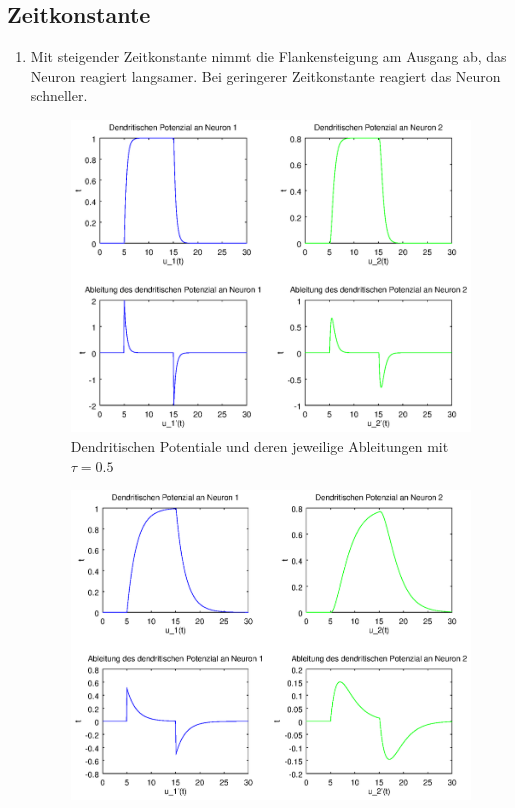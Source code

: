 \documentclass[DIN, pagenumber=false, fontsize=11pt, parskip=half]{scrartcl}
\begin{document}
    \subsection{Zeitkonstante}
    \begin{enumerate}[label=(\alph*)]
        \item Mit steigender Zeitkonstante nimmt die Flankensteigung am Ausgang ab, das Neuron reagiert langsamer.
            Bei geringerer Zeitkonstante reagiert das Neuron schneller. %
            \begin{figure}[H]
                \centering
                \includegraphics[trim = {0 9cm 27cm 0}, clip,width=\textwidth]{Plot_tau05}
                \caption{Dendritischen Potentiale und deren jeweilige Ableitungen mit $\tau=0.5$}
            \end{figure} 
            \begin{figure}[H]
                \centering
                \includegraphics[trim = {0 9cm 27cm 0}, clip,width=\textwidth]{Plot_tau2}

\end{figure}
\end{enumerate}
\end{document}
